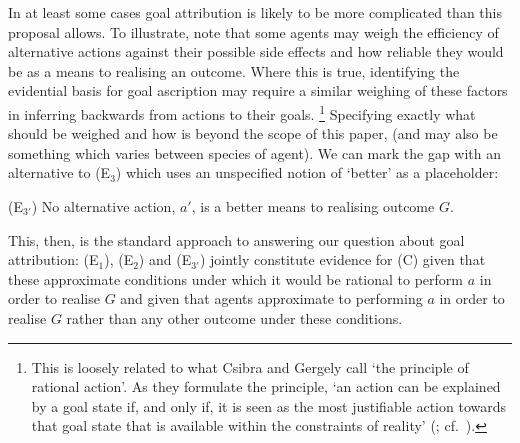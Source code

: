 \documentclass[14pt,a4paper]{extarticle}
\begin{document}
In at least some cases goal attribution is likely to be more complicated than this proposal allows.
To illustrate, note that some agents may weigh the efficiency of alternative actions against their possible side effects and how reliable they would be as a means to realising an outcome.
Where this is true, 
identifying the evidential basis for goal ascription may require  a similar weighing of these factors in inferring backwards from actions to their goals.%
\footnote{
This is loosely related to what Csibra and Gergely call `the principle of rational action'.
As they formulate the principle,
`an action can be explained by a goal state if, and only if, it is seen as the most justifiable action towards that goal state that is available within the constraints of reality'
(\citealp[p.\ *]{Csibra:1998cx}; cf.\ \citealp{Csibra:2003jv}).
}
Specifying exactly what should be weighed and how is beyond the scope of this paper,
(and may also be something which varies between species of agent).
We can mark the gap with an alternative to (E$_3$) which uses an unspecified notion of `better' as a placeholder:
%
\begin{idescription}
\item[(E$_{3'}$)] No alternative action, $a'$, is a better means to realising outcome $G$.
\end{idescription}
%
This, then, is the standard approach to answering our question about goal attribution: (E$_1$), (E$_2$) and (E$_{3'}$) jointly constitute evidence for (C) given that these approximate conditions under which it would be rational to perform $a$ in order to realise $G$ and given that agents approximate to performing $a$ in order to realise $G$ rather than any other outcome under these conditions.










\end{document}
